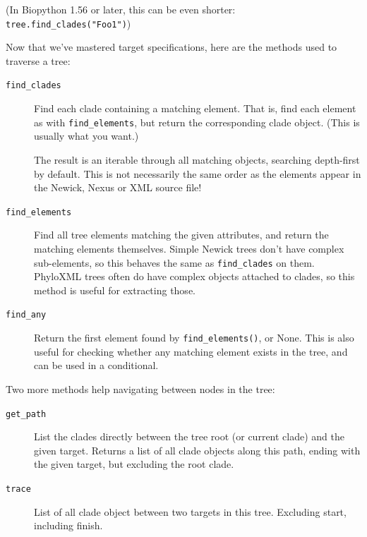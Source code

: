 \documentclass{report}
\begin{document}
(In Biopython 1.56 or later, this can be even shorter: \verb|tree.find_clades("Foo1")|)


Now that we've mastered target specifications, here are the methods used to traverse a tree:

\begin{description}
  \item[\texttt{find\_clades}]
    Find each clade containing a matching element. That is, find each element as with
    \verb|find_elements|, but return the corresponding clade object. (This is usually what you
    want.)

    The result is an iterable through all matching objects, searching depth-first by default.
    This is not necessarily the same order as the elements appear in the Newick, Nexus or XML
    source file!

  \item[\texttt{find\_elements}]
    Find all tree elements matching the given attributes, and return the matching elements
    themselves. Simple Newick trees don't have complex sub-elements, so this behaves the same
    as \verb|find_clades| on them. PhyloXML trees often do have complex objects attached to
    clades, so this method is useful for extracting those.

  \item[\texttt{find\_any}]
    Return the first element found by \verb|find_elements()|, or None. This is also useful for
    checking whether any matching element exists in the tree, and can be used in a conditional.

\end{description}

Two more methods help navigating between nodes in the tree:

\begin{description}
  \item[\texttt{get\_path}]
    List the clades directly between the tree root (or current clade) and the given target.
    Returns a list of all clade objects along this path, ending with the given target, but
    excluding the root clade.

  \item[\texttt{trace}]
    List of all clade object between two targets in this tree. Excluding start, including
    finish.

\end{description}
\end{document}
